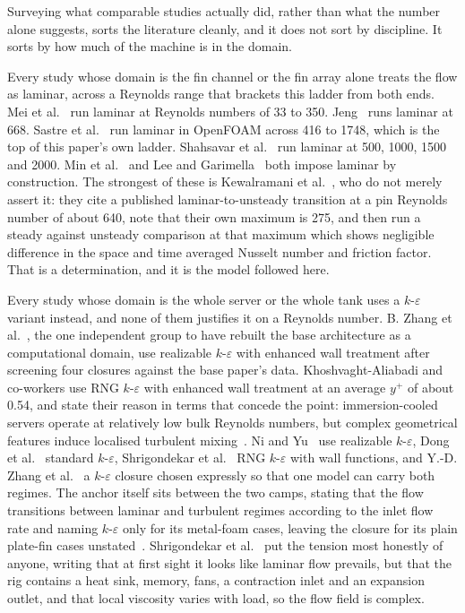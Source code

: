 Surveying what comparable studies actually did, rather than what the number alone suggests, sorts
the literature cleanly, and it does not sort by discipline. It sorts by how much of the machine is
in the domain.

Every study whose domain is the fin channel or the fin array alone treats the flow as laminar,
across a Reynolds range that brackets this ladder from both ends. Mei et al.~\cite{mei2014} run
laminar at Reynolds numbers of 33 to 350. Jeng~\cite{jeng2008} runs laminar at 668.
Sastre et al.~\cite{sastre2018} run laminar in OpenFOAM across 416 to 1748, which is the top of
this paper's own ladder. Shahsavar et al.~\cite{shahsavar2021} run laminar at 500, 1000, 1500 and
2000. Min et al.~\cite{min2004} and Lee and Garimella~\cite{lee2006} both impose laminar by
construction. The strongest of these is Kewalramani et al.~\cite{kewalramani2019}, who do not
merely assert it: they cite a published laminar-to-unsteady transition at a pin Reynolds number of
about 640, note that their own maximum is 275, and then run a steady against unsteady comparison at
that maximum which shows negligible difference in the space and time averaged Nusselt number and
friction factor. That is a determination, and it is the model followed here.

Every study whose domain is the whole server or the whole tank uses a $k$-$\varepsilon$ variant
instead, and none of them justifies it on a Reynolds number. B. Zhang et al.~\cite{zhang2026}, the
one independent group to have rebuilt the base architecture as a computational domain, use
realizable $k$-$\varepsilon$ with enhanced wall treatment after screening four closures against the
base paper's data. Khoshvaght-Aliabadi and co-workers use RNG $k$-$\varepsilon$ with enhanced wall
treatment at an average $y^+$ of about 0.54, and state their reason in terms that concede the
point: immersion-cooled servers operate at relatively low bulk Reynolds numbers, but complex
geometrical features induce localised turbulent
mixing~\cite{khoshvaghtaliabadi2026oblique,khoshvaghtaliabadi2025,khoshvaghtaliabadi2026component}.
Ni and Yu~\cite{ni2024} use realizable $k$-$\varepsilon$, Dong et al.~\cite{dong2026} standard
$k$-$\varepsilon$, Shrigondekar et al.~\cite{shrigondekar2023} RNG $k$-$\varepsilon$ with wall
functions, and Y.-D. Zhang et al.~\cite{zhang2024pao4} a $k$-$\varepsilon$ closure chosen expressly
so that one model can carry both regimes. The anchor itself sits between the two camps, stating
that the flow transitions between laminar and turbulent regimes according to the inlet flow rate
and naming $k$-$\varepsilon$ only for its metal-foam cases, leaving the closure for its plain
plate-fin cases unstated~\cite{chun2026}. Shrigondekar et al.~\cite{shrigondekar2023} put the
tension most honestly of anyone, writing that at first sight it looks like laminar flow prevails,
but that the rig contains a heat sink, memory, fans, a contraction inlet and an expansion outlet,
and that local viscosity varies with load, so the flow field is complex.

